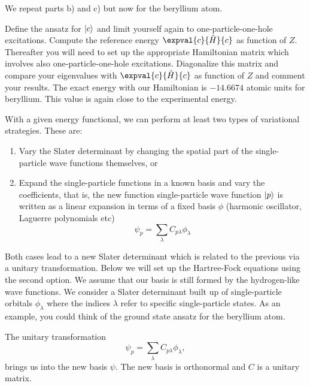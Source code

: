 We repeat parts b) and c) but now for the beryllium atom. %

Define the ansatz for $\lvert c\rangle$ and limit yourself again to one-particle-one-hole excitations.
Compute the reference energy $\expval{c}{\hat{H}}{c}$ as function of $Z$.
Thereafter you will need to set up the appropriate Hamiltonian matrix which involves also one-particle-one-hole excitations.
Diagonalize this matrix and compare your eigenvalues with $\expval{c}{\hat{H}}{c}$ as function of $Z$ and comment your results.
The exact energy with our Hamiltonian is $-14.6674$ atomic units for beryllium.
This value is again close to the experimental energy.

With a given energy functional, we can perform at least two types of variational strategies.
These are:
\begin{enumerate}
    \item Vary the Slater determinant by changing the spatial part of the single-particle wave functions themselves, or

    \item Expand the single-particle functions in a known basis  and vary the coefficients, that is, the new function single-particle wave function $\lvert p\rangle$ is written as a linear expansion in terms of a fixed basis $\phi$ (harmonic oscillator, Laguerre polynomials etc)
        \begin{equation*}
            \psi_p  = \sum_{\lambda} C_{p\lambda}\phi_{\lambda}
        \end{equation*}
\end{enumerate}
Both cases lead to a new Slater determinant which is related to the previous via a unitary transformation.
Below we will set up the Hartree-Fock equations using the second option.
We assume that our basis is still formed by the hydrogen-like wave functions.
We consider a Slater determinant built up of single-particle orbitals $\phi_{\lambda}$ where the indices $\lambda$ refer to specific single-particle states.
As an example, you could think of the ground state ansatz for the beryllium atom.

The unitary transformation
\begin{equation*}
    \psi_p  = \sum_{\lambda} C_{p\lambda}\phi_{\lambda},
\end{equation*}
brings us into the new basis $\psi$.
The new basis is orthonormal and $C$ is a unitary matrix.
